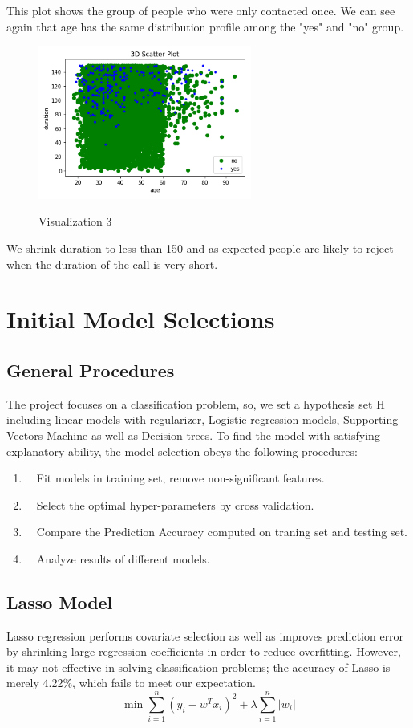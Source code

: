 \documentclass[forprint]{mytemplate}
\begin{document}
\begin{multicols}{2}
This plot shows the group of people who were only contacted once. We can see again that age has the same distribution profile among the "yes" and "no" group.
\begin{figure}[H]
  \centering
  \includegraphics[width=7cm]{age_dur_scat_shrt.PNG}\\
  \caption{Visualization 3}\label{g03}
\end{figure}

We shrink duration to less than 150 and as expected people are likely to reject when the duration of the call is very short.

\section{\color{blue}Initial Model Selections}
\subsection{General Procedures}
The project focuses on a classification problem, so, we set a hypothesis set H including linear models with regularizer, Logistic regression models, Supporting Vectors Machine as well as Decision trees. To find the model with satisfying explanatory ability, the model selection obeys the following procedures:

\begin{enumerate}
  \item ~~Fit models in training set, remove non-significant features.
  \item ~~Select the optimal hyper-parameters by cross validation.
  \item ~~Compare the Prediction Accuracy computed on traning set and testing set.
  \item ~~Analyze results of different models.
\end{enumerate}
\subsection{Lasso Model}
Lasso regression performs covariate selection as well as improves prediction error by shrinking large regression coefficients in order to reduce overfitting. However, it may not effective in solving classification problems; the accuracy of Lasso is merely 4.22\%, which fails to meet our expectation.
\begin{equation}\label{eq01}
  \min \sum_{i=1}^n(y_i-w^Tx_i)^2+\lambda\sum_{i=1}^n|w_i|
\end{equation}

\end{multicols}
\end{document}
